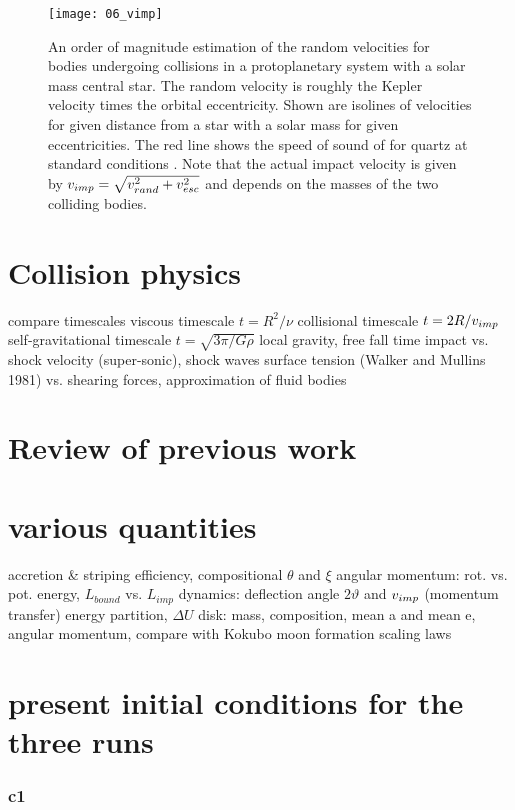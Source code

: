 \begin{figure}[htbp]
\begin{center}
\texttt{[image: 06\_vimp]}
\caption{An order of magnitude estimation of the random velocities for bodies undergoing collisions in a protoplanetary system with a solar mass central star. The random velocity is roughly the Kepler velocity times the orbital eccentricity. Shown are isolines of velocities for given distance from a star with a solar mass for given eccentricities. The red line shows the speed of sound of for quartz at standard conditions \cite{Melosh:2007p3502}. Note that the actual impact velocity is given by $v_{imp} = \sqrt{ v_{rand}^2 + v_{esc}^2}$ and depends on the masses of the two colliding bodies.}
\label{ch03_fig06}
\end{center}
\end{figure}


\section{Collision physics}
compare timescales
viscous timescale $t = R^2 / \nu$
collisional timescale $t = 2 R / v_{imp}$
self-gravitational timescale $t = \sqrt{3\pi / G \rho}$
local gravity, free fall time
impact vs. shock velocity (super-sonic), shock waves
surface tension (Walker and Mullins 1981) vs. shearing forces, approximation of fluid bodies

\section{Review of previous work}


\section{various quantities}
accretion \& striping efficiency, compositional $\theta$ and $\xi$
angular momentum: rot. vs. pot. energy, $L_{bound}$ vs. $L_{imp}$
dynamics: deflection angle $2 \vartheta$ and $v_{imp}$ (momentum transfer)
energy partition, $\Delta U$
disk: mass, composition, mean a and mean e, angular momentum, compare with Kokubo moon formation scaling laws


\section{present initial conditions for the three runs}
\subsubsection{c1}
